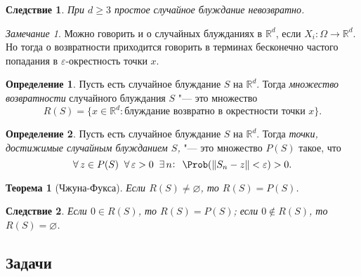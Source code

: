 \documentclass[a4paper]{article}
\theoremstyle{plain}
\newtheorem{thm}{Теорема}[section]
\newtheorem*{cor}{Следствие}
\theoremstyle{definition}
\newtheorem{defn}{Определение}[section]
\theoremstyle{remark}
\newtheorem*{rem}{Замечание}
\theoremstyle{nonumberplain}
\theoremstyle{nonumberplain}
\begin{document}
\begin{cor}
  При $d \geqslant 3$ простое случайное блуждание невозвратно.
\end{cor}

\begin{rem}
  \sloppy
  Можно говорить и о случайных блужданиях в $\mathbb{R}^d$, если $X_{i}: \Omega \rightarrow \mathbb{R}^d$. Но тогда о возвратности приходится говорить в терминах бесконечно частого попадания в $\varepsilon$-окрестность точки $x$.
\end{rem}

\begin{defn}
  Пусть есть случайное блуждание $S$ на $\mathbb{R}^d$. Тогда \emph{множество возвратности} случайного блуждания $S$ "--- это множество
  \begin{equation*}
    R(S) = \lbrace x \in \mathbb{R}^d : \text{блуждание возвратно в окрестности точки } x \rbrace \text{.}
  \end{equation*}
\end{defn}

\begin{defn}
  Пусть есть случайное блуждание $S$ на $\mathbb{R}^d$. Тогда \emph{точки, достижимые случайным блужданием $S$,} "--- это множество $P(S)$ такое, что
  \begin{equation*}
    \forall\, z \in P(S) \; \; \forall\, \varepsilon > 0 \; \; \exists\, n \negmedspace : \; \, \Prob( \| S_{n} - z \| < \varepsilon) > 0 \text{.}
  \end{equation*}
\end{defn}

\begin{thm}[Чжуна-Фукса]
  Если $R(S) \neq \varnothing$, то $R(S) = P(S)$.
\end{thm}

\begin{cor}
  Если $0 \in R(S)$, то $R(S) = P(S)$; если
  $0 \notin R(S)$, то  $R(S) = \varnothing$.
\end{cor}

\subsection{Задачи}
\end{document}
